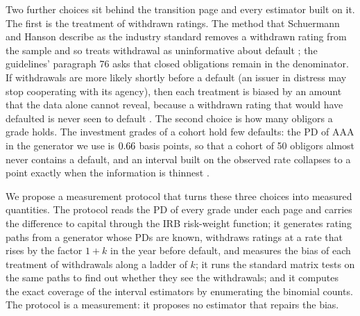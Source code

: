 Two further choices sit behind the transition page and every estimator built on it. The first is the treatment of withdrawn ratings. The method that Schuermann and Hanson describe as the industry standard removes a withdrawn rating from the sample and so treats withdrawal as uninformative about default \citep{Schuermann_2004}; the guidelines' paragraph 76 asks that closed obligations remain in the denominator. If withdrawals are more likely shortly before a default (an issuer in distress may stop cooperating with its agency), then each treatment is biased by an amount that the data alone cannot reveal, because a withdrawn rating that would have defaulted is never seen to default \citep{Cantor_2007,Tsiatis_1975}. The second choice is how many obligors a grade holds. The investment grades of a cohort hold few defaults: the PD of AAA in the generator we use is $0.66$ basis points, so that a cohort of 50 obligors almost never contains a default, and an interval built on the observed rate collapses to a point exactly when the information is thinnest \citep{Brown_2001,Hanson_2006}. %

We propose a measurement protocol that turns these three choices into measured quantities. The protocol reads the PD of every grade under each page and carries the difference to capital through the IRB risk-weight function; it generates rating paths from a generator whose PDs are known, withdraws ratings at a rate that rises by the factor $1+k$ in the year before default, and measures the bias of each treatment of withdrawals along a ladder of $k$; it runs the standard matrix tests on the same paths to find out whether they see the withdrawals; and it computes the exact coverage of the interval estimators by enumerating the binomial counts. The protocol is a measurement: it proposes no estimator that repairs the bias. %

